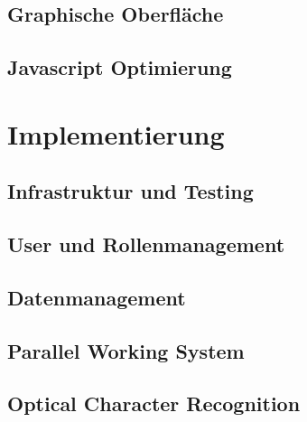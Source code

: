 \documentclass[12pt]{article}
\begin{document}
\newpage

\subsection{Graphische Oberfläche}
\label{subsec:graphischeoberflaeche}


\newpage

\subsection{Javascript Optimierung}
\label{subsec:javascriptoptimierung}


\newpage %

\section{Implementierung}
\label{sec:implementierung}


\subsection{Infrastruktur und Testing}
\label{subsec:infrastrukturtesting}


\newpage

\subsection{User und Rollenmanagement}
\label{subsec:usermanagement}


\newpage

\subsection{Datenmanagement}
\label{subsec:datenmanagement}


\newpage

\subsection{Parallel Working System}
\label{subsec:parallelws}


\newpage

\subsection{Optical Character Recognition}
\label{subsec:ocr}

\end{document}
